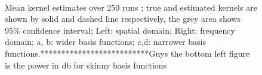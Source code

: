 \documentclass[12pt]{iopart}
\begin{document}
\begin{figure}
\\

\caption{Mean kernel estimates over 250 runs ;  true and estimated kernels are shown by solid
and dashed line respectively, the grey area shows 95\% confidence interval; Left: spatial domain; Right: frequency domain; a, b: wider basis functions; c,d: narrower basis functions.**************************Guys the bottom left figure is the power in db for skinny basis functions}
\label{fig:KernelEstimates}
\end{figure}
\end{document}
